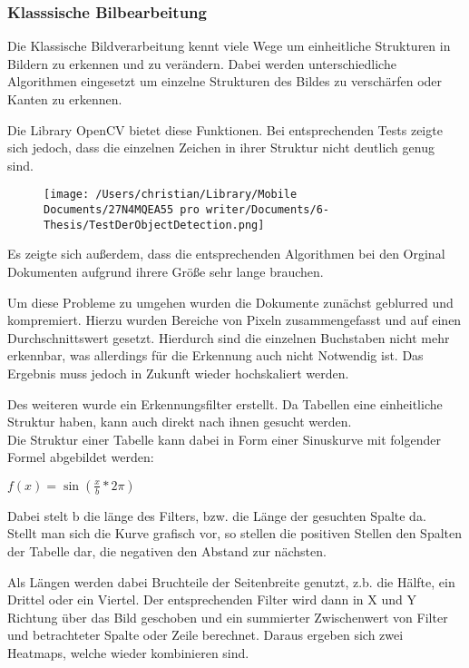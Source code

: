 \documentclass[
]{article}
\begin{document}
\hypertarget{header-n82}{%
\subsubsection{Klasssische Bilbearbeitung}\label{header-n82}}

Die Klassische Bildverarbeitung kennt viele Wege um einheitliche
Strukturen in Bildern zu erkennen und zu verändern. Dabei werden
unterschiedliche Algorithmen eingesetzt um einzelne Strukturen des
Bildes zu verschärfen oder Kanten zu erkennen.

Die Library OpenCV bietet diese Funktionen. Bei entsprechenden Tests
zeigte sich jedoch, dass die einzelnen Zeichen in ihrer Struktur nicht
deutlich genug sind.

\begin{figure}
\centering
\texttt{[image: /Users/christian/Library/Mobile Documents/27N4MQEA55~pro~writer/Documents/6-Thesis/TestDerObjectDetection.png]}
\caption{}
\end{figure}

Es zeigte sich außerdem, dass die entsprechenden Algorithmen bei den
Orginal Dokumenten aufgrund ihrere Größe sehr lange brauchen.

Um diese Probleme zu umgehen wurden die Dokumente zunächst geblurred und
kompremiert. Hierzu wurden Bereiche von Pixeln zusammengefasst und auf
einen Durchschnittswert gesetzt. Hierdurch sind die einzelnen Buchstaben
nicht mehr erkennbar, was allerdings für die Erkennung auch nicht
Notwendig ist. Das Ergebnis muss jedoch in Zukunft wieder hochskaliert
werden.

Des weiteren wurde ein Erkennungsfilter erstellt. Da Tabellen eine
einheitliche Struktur haben, kann auch direkt nach ihnen gesucht werden.
\\
Die Struktur einer Tabelle kann dabei in Form einer Sinuskurve mit
folgender Formel abgebildet werden:

\(f(x)=\sin(\frac{x}{b} * 2\pi)\)

Dabei stelt b die länge des Filters, bzw. die Länge der gesuchten Spalte
da. \\
Stellt man sich die Kurve grafisch vor, so stellen die positiven Stellen
den Spalten der Tabelle dar, die negativen den Abstand zur nächsten.

Als Längen werden dabei Bruchteile der Seitenbreite genutzt, z.b. die
Hälfte, ein Drittel oder ein Viertel. Der entsprechenden Filter wird
dann in X und Y Richtung über das Bild geschoben und ein summierter
Zwischenwert von Filter und betrachteter Spalte oder Zeile berechnet.
Daraus ergeben sich zwei Heatmaps, welche wieder kombinieren sind.
\end{document}
